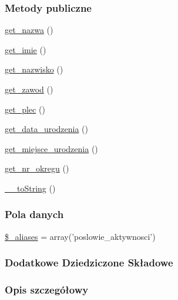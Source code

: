 \subsubsection*{Metody publiczne}
\begin{DoxyCompactItemize}
\item 
\hyperlink{classep___posel___aktywnosc_ac0818f0049d7b84f08f77128f54cee36}{get\-\_\-nazwa} ()
\item 
\hyperlink{classep___posel___aktywnosc_ac4b0c85dc2a130038f2d118dbd0c3d77}{get\-\_\-imie} ()
\item 
\hyperlink{classep___posel___aktywnosc_abdd1d7ff92508da7f748ba1feec97af0}{get\-\_\-nazwisko} ()
\item 
\hyperlink{classep___posel___aktywnosc_af80ca8310b60004454dd02a387deaa2c}{get\-\_\-zawod} ()
\item 
\hyperlink{classep___posel___aktywnosc_ac7f9af5c3fa024e4c26a7b6bd4ce4bb4}{get\-\_\-plec} ()
\item 
\hyperlink{classep___posel___aktywnosc_a880b240cd2d8c336fd1709bf0cb1ae2c}{get\-\_\-data\-\_\-urodzenia} ()
\item 
\hyperlink{classep___posel___aktywnosc_ac57c08ec5e394a19c5bd9280c8376182}{get\-\_\-miejsce\-\_\-urodzenia} ()
\item 
\hyperlink{classep___posel___aktywnosc_a2645a9f0aa5b0ccc482943348c033d0a}{get\-\_\-nr\-\_\-okregu} ()
\item 
\hyperlink{classep___posel___aktywnosc_a7516ca30af0db3cdbf9a7739b48ce91d}{\-\_\-\-\_\-to\-String} ()
\end{DoxyCompactItemize}
\subsubsection*{Pola danych}
\begin{DoxyCompactItemize}
\item 
\hyperlink{classep___posel___aktywnosc_ab4e31d75f0bc5d512456911e5d01366b}{\$\-\_\-aliases} = array('poslowie\-\_\-aktywnosci')
\end{DoxyCompactItemize}
\subsubsection*{Dodatkowe Dziedziczone Składowe}


\subsubsection{Opis szczegółowy}


